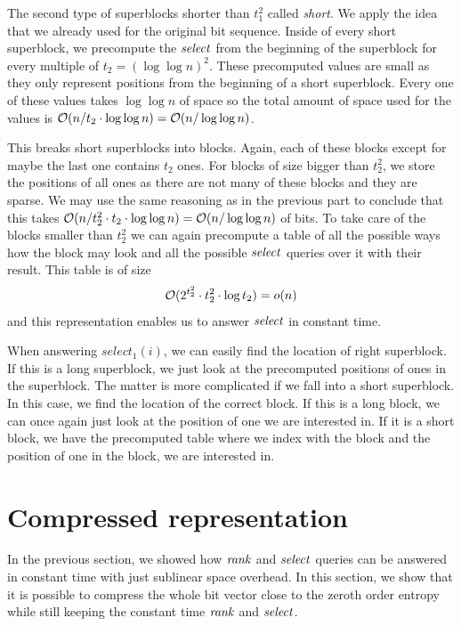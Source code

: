 The second type of superblocks shorter than $t_1^2$ called
\textit{short}. We apply the idea that we already used for the original bit sequence. Inside of
every short superblock, we precompute the $\mathit{select}$ from the beginning of the superblock for every
multiple of $t_2=(\log\log n)^2$. These precomputed values are small as they only represent positions
from the beginning of a short superblock. Every one of these values takes $\log\log n$ of space so the
total amount of space used for the values is $\mathcal{O}(n/t_2\cdot \log\log n) = \mathcal{O}(n/\log\log n)$.

This breaks short superblocks into blocks. Again, each of these blocks except for maybe the
last one contains $t_2$ ones. For blocks of size bigger than $t_2^2$, we store the positions of all
ones as there are not many of these blocks and they are sparse. We may use the same reasoning as
in the previous part to conclude that this takes $\mathcal{O}(n/t_2^2\cdot t_2\cdot \log\log n) = \mathcal{O}(n/\log\log n)$
of bits. To take care of the blocks smaller than $t_2^2$ we can again precompute a table of all
the possible ways how the block may look and all the possible $\mathit{select}$ queries over it with
their result. This table is of size $$\mathcal{O}(2^{t_2^2}\cdot t_2^2 \cdot \log t_2) = o(n)$$
and this representation enables us to answer $\mathit{select}$ in constant time.

When answering $select_1(i)$, we can easily find the location of right superblock. If this
is a long superblock, we just look at the precomputed positions of ones in the superblock.
The matter is more complicated if we fall into a short superblock. In this case, we find
the location of the correct block. If this is a long block, we can once again just look
at the position of one we are interested in. If it is a short block, we have the precomputed
table where we index with the block and the position of one in the block, we are interested in.

\section{Compressed representation}
\label{section:compressed_bv}

In the previous section, we showed how $\mathit{rank}$ and $\mathit{select}$ queries can be answered in constant
time with just sublinear space overhead. In this section, we show that it is possible to compress
the whole bit vector close to the zeroth order entropy while still keeping the constant time $\mathit{rank}$
and $\mathit{select}$.

